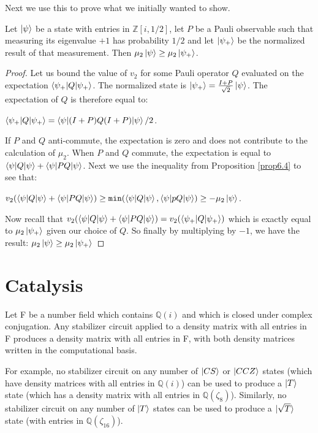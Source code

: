 \documentclass[12pt]{dalthesis}
\begin{document}
Next we use this to prove what we initially wanted to show.
\begin{proposition}
Let $\ket{\psi}$ be a state with entries in $\mathbb{Z}[i, 1/2]$, let $P$ be a Pauli observable such that measuring its eigenvalue $+1$ has probability $1/2$ and let $\ket{\psi_+}$ be the normalized result of that measurement. Then $\mu_2\ket{\psi} \geq \mu_2\ket{\psi_+}$. 
\end{proposition}
\begin{proof}
Let us bound the value of $v_2$ for some Pauli operator $Q$ evaluated on the expectation $\braket{\psi_+ | Q |\psi_+}$. The normalized state is $\ket{\psi_+} = \frac{I + P}{\sqrt{2}}\ket{\psi}$. The expectation of $Q$ is therefore equal to:
\begin{center}
$\braket{\psi_+ | Q |\psi_+} = \braket{\psi | (I + P)Q(I + P) | \psi}/2$.
\end{center}
If $P$ and $Q$ anti-commute, the expectation is zero and does not contribute to the calculation of $\mu_2$. When $P$ and $Q$ commute, the expectation is equal to $\braket{\psi | Q | \psi} + \braket{\psi |PQ |\psi}$. Next we use the inequality from Proposition \ref{prop6.4} to see that:
\begin{center}
$v_2(\braket{\psi |Q| \psi} + \braket{\psi |PQ| \psi}) \geq \texttt{min}(\braket{\psi |Q|\psi}, \braket{\psi |pQ|\psi}) \geq -\mu_2\ket{\psi}$.
\end{center}
Now recall that $v_2(\braket{\psi |Q| \psi} + \braket{\psi |PQ| \psi}) = v_2(\braket{\psi_+ |Q| \psi_+})$ which is exactly equal to $\mu_2\ket{\psi_+}$ given our choice of $Q$. So finally by multiplying by $-1$, we have the result: $\mu_2\ket{\psi} \geq \mu_2\ket{\psi_+}$
\end{proof}


\section{Catalysis}

\begin{theorem}
Let F be a number field which contains $\mathbb{Q}(i)$ and which is closed under complex conjugation. Any stabilizer circuit applied to a density matrix with all entries in F produces a density matrix with all entries in F, with both density matrices written in the computational basis.
\end{theorem}

For example, no stabilizer circuit on any number of $\ket{CS}$ or $\ket{CCZ}$ states (which have density matrices with all entries in $\mathbb{Q}(i)$) can be used to produce a $\ket{T}$ state (which has a density matrix with all entries in $\mathbb{Q}(\zeta_8)$). Similarly, no stabilizer circuit on any number of $\ket{T}$ states can be used to produce a $\ket{\sqrt{T}}$ state (with entries in $\mathbb{Q}(\zeta_{16})$).
 
\end{document}
